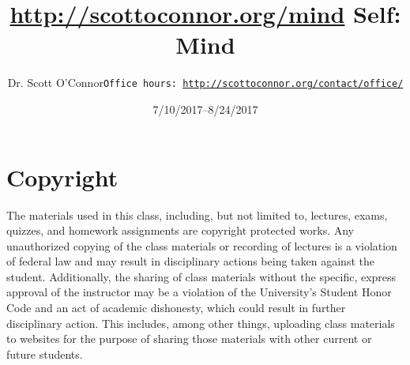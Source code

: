 \documentclass[article,oneside]{memoir}
\def\myauthor{Author}
\def\mytitle{Title}
\def\mycopyright{\myauthor}
\def\myweb{\href{http://scottoconnor.org/mind}{http://scottoconnor.org/mind}}
\def\myauthor{Dr. Scott O'Connor}
\def\mytitle{{\normalsize \myweb \newline} \HUGE Self: Mind}
\begin{document}
\setsansfont[Mapping=tex-text]{Myriad Pro} 
\setmonofont[Mapping=tex-text,Scale=0.8]{Georgia} 

\def\ind{\hangindent=1 true cm\hangafter=1 \noindent}
\def\labelitemi{$\cdot$}


\title{\LARGE \mytitle}     
\author{\Large\myauthor \newline \footnotesize\texttt{\noindent Office hours: \href{http://scottoconnor.org/contact/office/}{http://scottoconnor.org/contact/office/}}}
\date{7/10/2017--8/24/2017}


\maketitle




%
%

\section{Copyright}
The materials used in this class, including, but not limited to, lectures, exams, quizzes, and homework assignments are copyright protected works.  Any unauthorized copying of the class materials or recording of lectures is a violation of federal law and may result in disciplinary actions being taken against the student.  Additionally, the sharing of class materials without the specific, express approval of the instructor may be a violation of the University's Student Honor Code and an act of academic dishonesty, which could result in further disciplinary action.  This includes, among other things, uploading class materials to websites for the purpose of sharing those materials with other current or future students. 
\end{document}
